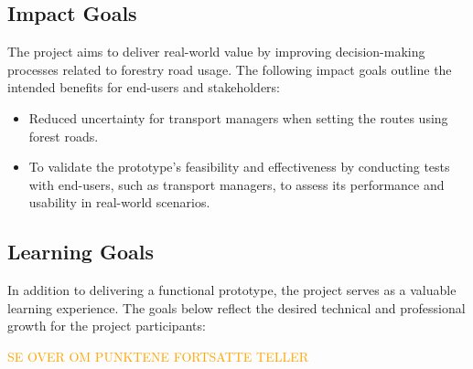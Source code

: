 \subsection{Impact Goals}\label{subsec:req:impactgoals}

The project aims to deliver real-world value by improving decision-making processes related to forestry road usage. The following impact goals outline the intended benefits for end-users and stakeholders:

\begin{itemize}
    \item Reduced uncertainty for transport managers when setting the routes using forest roads.
    \item To validate the prototype's feasibility and effectiveness by conducting tests with end-users, such as transport managers, to assess its performance and usability in real-world scenarios.
\end{itemize}

\subsection{Learning Goals}\label{subsec:req:learninggoals}

In addition to delivering a functional prototype, the project serves as a valuable learning experience. The goals below reflect the desired technical and professional growth for the project participants:

\textcolor{orange}{SE OVER OM PUNKTENE FORTSATTE TELLER}

